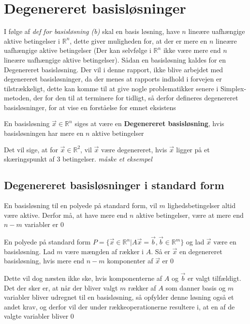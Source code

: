 \section{Degenereret basisløsninger}
I følge af \textit{def for basisløsning (b)} skal en basis løsning, have $n$ lineære uafhængige aktive betingelser i $\mathds{R}^n$, dette giver muligheden for, at der er mere en $n$ lineære uafhængige aktive betingelser (Der kan selvfølge i $\mathds{R}^n$ ikke være mere end $n$ lineære uafhængige aktive betingelser). Sådan en basisløsning kaldes for en Degenereret basisløsning. Der vil i denne rapport, ikke blive arbejdet med degenereret basisløsninger, da der menes at rapports indhold i forvejen er tilstrækkeligt, dette kan komme til at give nogle problematikker senere i Simplex-metoden, der for den til at terminere for tidligt, så derfor defineres degenereret basisløsninger, for at vise en forståelse for emnet eksistens
\begin{defn}
En basisløsning $\vec{x}\in \mathds{R}^n$ siges at være en \textbf{Degenereret basisløsning}, hvis basisløsningen har mere en $n$ aktive betingelser
\end{defn}

Det vil sige, at for $\vec{x}\in \mathds{R}^2$, vil $\vec{x}$ være degenereret, hvis $\vec{x}$ ligger på et skæringspunkt af $3$ betingelser.
\textit{måske et eksempel}\\
\subsection{Degenereret basisløsninger i standard form}
En basisløsning til en polyede på standard form, vil $m$ lighedsbetingelser altid være aktive. Derfor må, at have mere end $n$ aktive betingelser, være at mere end $n-m$ variabler er $0$
\begin{defn}
En polyede på standard form $P =\{ \vec{x} \in \mathds{R}^n | A \vec{x} = \vec{b}, \vec{b}\in \mathds{R}^m\}$ og lad $\vec{x}$ være en basisløsning. Lad $m$ være mængden af rækker i $A$. Så er $\vec{x}$ en degenereret basisløsning, hvis mere end $n-m$ komponenter af $\vec{x}$ er $0$
\end{defn}
Dette vil dog næsten ikke ske, hvis komponenterne af $A$ og $\vec{b}$ er valgt tilfældigt.
Det der sker er, at når der bliver valgt $m$ rækker af $A$ som danner basis og $m$ variabler bliver udregnet til en basisløsning, så opfylder denne løsning også et andet krav, og derfor vil der under rækkeoperationerne resultere i, at en af de valgte variabler bliver $0$
